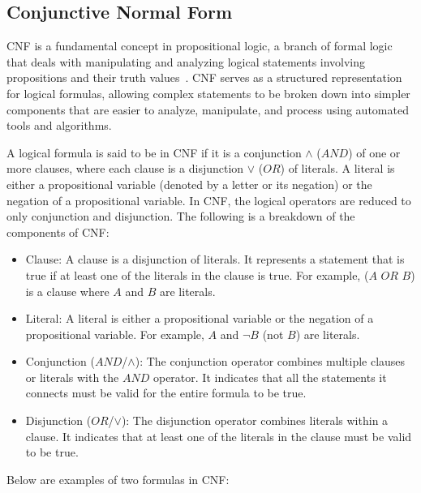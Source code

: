     
    \subsection{Conjunctive Normal Form}
    
    CNF is a fundamental concept in propositional logic, a branch of formal logic that deals with manipulating and analyzing logical statements involving propositions and their truth values~\cite{sulflow2008using}. CNF serves as a structured representation for logical formulas, allowing complex statements to be broken down into simpler components that are easier to analyze, manipulate, and process using automated tools and algorithms.
    
    
    A logical formula is said to be in CNF if it is a conjunction $\wedge$ ($AND$) of one or more clauses, where each clause is a disjunction $\vee$ ($OR$) of literals. A literal is either a propositional variable (denoted by a letter or its negation) or the negation of a propositional variable. In CNF, the logical operators are reduced to only conjunction and disjunction.
    The following is a breakdown of the components of CNF:
    
    \begin{itemize}
        
        \item Clause: A clause is a disjunction of literals. It represents a statement that is true if at least one of the literals in the clause is true. For example, ($A$ $OR$ $B$) is a clause where $A$ and $B$ are literals. 
        
        \item Literal: A literal is either a propositional variable or the negation of a propositional variable. For example, $A$ and $\neg B$ (not $B$) are literals.
        
        \item Conjunction ($AND$/$\wedge$): The conjunction operator combines multiple clauses or literals with the $AND$ operator. It indicates that all the statements it connects must be valid for the entire formula to be true.
        
        \item Disjunction ($OR$/$\vee$): The disjunction operator combines literals within a clause. It indicates that at least one of the literals in the clause must be valid to be true.
    
    \end{itemize}
    Below are examples of two formulas in CNF:

